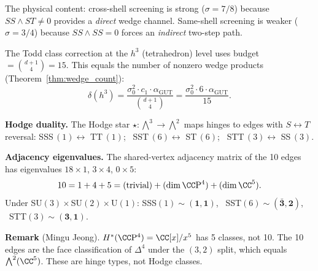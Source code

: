 The physical content: cross-shell screening is strong ($\sigma = 7/8$) because $SS \wedge ST \neq 0$ provides a \emph{direct} wedge channel.  Same-shell screening is weaker ($\sigma = 3/4$) because $SS \wedge SS = 0$ forces an \emph{indirect} two-step path.

\begin{theorem}
The Todd class correction at the $h^3$ (tetrahedron) level uses budget $= \binom{d+1}{4} = 15$.  This equals the number of nonzero wedge products (Theorem~\ref{thm:wedge_count}):
\[
\delta(h^3) = \frac{\sigma_0^2 \cdot c_1 \cdot \alpha_\text{GUT}}{\binom{d+1}{4}}
= \frac{\sigma_0^2 \cdot 6 \cdot \alpha_\text{GUT}}{15}.
\]
\end{theorem}

\noindent\textbf{Hodge duality.}
The Hodge star $\star\!: \bigwedge^3 \to \bigwedge^2$ maps hinges to edges with $S \leftrightarrow T$ reversal:
SSS$\,(1) \leftrightarrow$ TT$\,(1)$; \ SST$\,(6) \leftrightarrow$ ST$\,(6)$; \ STT$\,(3) \leftrightarrow$ SS$\,(3)$.

\smallskip\noindent\textbf{Adjacency eigenvalues.}
The shared-vertex adjacency matrix of the 10 edges has eigenvalues $18 \times 1$, $3 \times 4$, $0 \times 5$:
\[
10 = 1 + 4 + 5 = (\text{trivial}) + (\dim\CC\mathrm{P}^4) + (\dim\CC^5).
\]
Under SU$(3) \times$SU$(2) \times$U$(1)$:
SSS$(1) \sim (\mathbf{1},\mathbf{1})$, \
SST$(6) \sim (\bar{\mathbf{3}},\mathbf{2})$, \
STT$(3) \sim (\mathbf{3},\mathbf{1})$.

\smallskip\noindent\textbf{Remark} (Mingu Jeong).
$H^*(\CC\mathrm{P}^4) = \CC[x]/x^5$ has 5 classes, not 10.  The 10 edges are the face classification of $\Delta^4$ under the $(3,2)$ split, which equals $\bigwedge^2(\CC^5)$.  These are hinge types, not Hodge classes.
